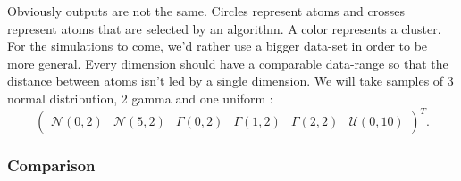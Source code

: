 \documentclass{amsart}
\begin{document}
Obviously outputs are not the same. Circles represent atoms and crosses represent atoms that are selected by an algorithm. A color represents a cluster. For the simulations to come, we'd rather use a bigger data-set in order to be more general. Every dimension should have a comparable data-range so that the distance between atoms isn't led by a single dimension. We will take samples of 3 normal distribution, 2 gamma and one uniform :
$$
\begin{pmatrix}
    \mathcal{N}\left(0,2\right) & \mathcal{N}\left(5,2\right) & \Gamma\left(0,2\right) & \Gamma\left(1,2\right) &\Gamma\left(2,2\right) & \mathcal{U}\left(0,10\right)
\end{pmatrix}^T.
$$

\subsubsection{Comparison}
\end{document}
